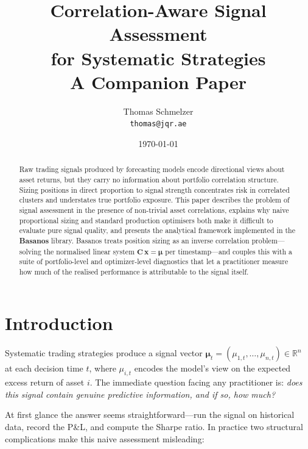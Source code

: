 \documentclass[11pt,a4paper]{article}
\title{%
  \textbf{Correlation-Aware Signal Assessment\\
  for Systematic Strategies}\\[0.5em]
  \large A Companion Paper
}
\author{Thomas Schmelzer \\ \small\texttt{thomas@jqr.ae}}
\date{\today}
\newcommand{\C}{\mathbf{C}}
\newcommand{\x}{\mathbf{x}}
\newcommand{\muvec}{\bm{\mu}}
\newcommand{\R}{\mathbb{R}}
\begin{document}
\maketitle

\begin{abstract}
Raw trading signals produced by forecasting models encode directional views
about asset returns, but they carry no information about portfolio correlation
structure.  Sizing positions in direct proportion to signal strength
concentrates risk in correlated clusters and understates true portfolio
exposure.  This paper describes the problem of signal assessment in the
presence of non-trivial asset correlations, explains why naive proportional
sizing and standard production optimisers both make it difficult to evaluate
pure signal quality, and presents the analytical framework implemented in the
\textbf{Basanos} library.  Basanos treats position sizing as an inverse
correlation problem---solving the normalised linear system $\C\,\x = \muvec$
per timestamp---and couples this with a suite of portfolio-level and
optimizer-level diagnostics that let a practitioner measure how much of the
realised performance is attributable to the signal itself.
\end{abstract}

\tableofcontents

\newpage

\section{Introduction}
\label{sec:intro}

Systematic trading strategies produce a signal vector
$\muvec_t = (\mu_{1,t}, \dots, \mu_{n,t}) \in \R^n$ at each
decision time $t$, where $\mu_{i,t}$ encodes the model's view on the
expected excess return of asset $i$.  The immediate question facing any
practitioner is: \emph{does this signal contain genuine predictive information,
and if so, how much?}

At first glance the answer seems straightforward---run the signal on historical
data, record the P\&L, and compute the Sharpe ratio.  In practice two
structural complications make this naive assessment misleading:
\end{document}
